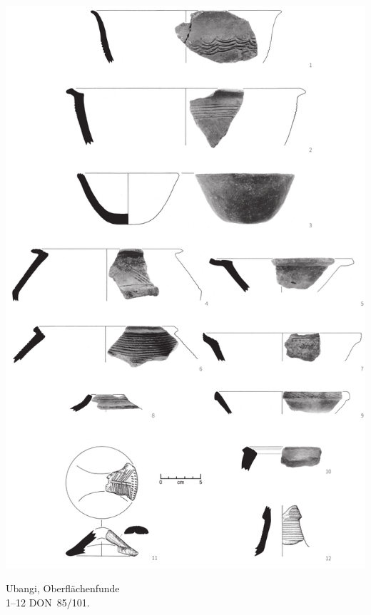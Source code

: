 \begin{pl}[H]
	\includegraphics{plt/Taf8.pdf}
	\vspace{.75em}\caption{\mbox{Ubangi}, Oberflächenfunde \\ 1--12 DON~85/101.}
	\label{pl:8}
\end{pl}

